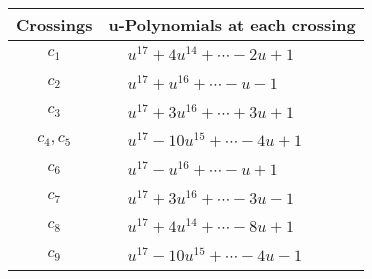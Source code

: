 \documentclass[1p]{elsarticle_modified}
\theoremstyle{definition}
\begin{document}
\begin{tabular}{m{50pt}|m{274pt}}
Crossings & \hspace{64pt}u-Polynomials at each crossing \\
\hline $$\begin{aligned}c_{1}\end{aligned}$$&$\begin{aligned}
&u^{17}+4 u^{14}+\cdots-2 u+1
\end{aligned}$\\
\hline $$\begin{aligned}c_{2}\end{aligned}$$&$\begin{aligned}
&u^{17}+u^{16}+\cdots- u-1
\end{aligned}$\\
\hline $$\begin{aligned}c_{3}\end{aligned}$$&$\begin{aligned}
&u^{17}+3 u^{16}+\cdots+3 u+1
\end{aligned}$\\
\hline $$\begin{aligned}c_{4},c_{5}\end{aligned}$$&$\begin{aligned}
&u^{17}-10 u^{15}+\cdots-4 u+1
\end{aligned}$\\
\hline $$\begin{aligned}c_{6}\end{aligned}$$&$\begin{aligned}
&u^{17}- u^{16}+\cdots- u+1
\end{aligned}$\\
\hline $$\begin{aligned}c_{7}\end{aligned}$$&$\begin{aligned}
&u^{17}+3 u^{16}+\cdots-3 u-1
\end{aligned}$\\
\hline $$\begin{aligned}c_{8}\end{aligned}$$&$\begin{aligned}
&u^{17}+4 u^{14}+\cdots-8 u+1
\end{aligned}$\\
\hline $$\begin{aligned}c_{9}\end{aligned}$$&$\begin{aligned}
&u^{17}-10 u^{15}+\cdots-4 u-1
\end{aligned}$\\

\end{tabular}
\end{document}
